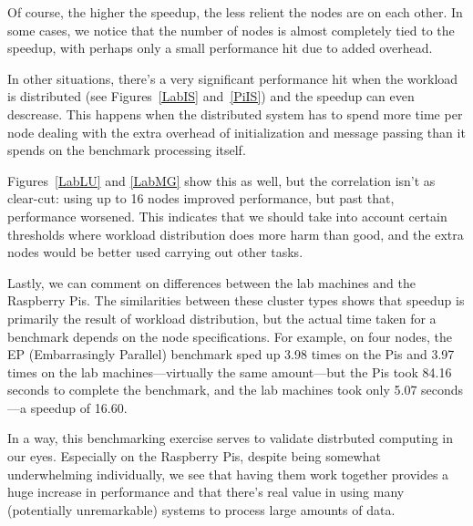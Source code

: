 \documentclass{acm_proc_article-sp}
\begin{document}
Of course, the higher the speedup, the less relient the nodes are on each other. In some cases, we notice that the number of nodes is almost completely tied to the speedup, with perhaps only a small performance hit due to added overhead.

In other situations, there's a very significant performance hit when the workload is distributed (see Figures~\ref{LabIS} and~\ref{PiIS}) and the speedup can even descrease. This happens when the distributed system has to spend more time per node dealing with the extra overhead of initialization and message passing than it spends on the benchmark processing itself.

Figures~\ref{LabLU} and \ref{LabMG} show this as well, but the correlation isn't as clear-cut: using up to 16 nodes improved performance, but past that, performance worsened. This indicates that we should take into account certain thresholds where workload distribution does more harm than good, and the extra nodes would be better used carrying out other tasks.

Lastly, we can comment on differences between the lab machines and the Raspberry Pis. The similarities between these cluster types shows that speedup is primarily the result of workload distribution, but the actual time taken for a benchmark depends on the node specifications. For example, on four nodes, the EP (Embarrasingly Parallel) benchmark sped up 3.98 times on the Pis and 3.97 times on the lab machines---virtually the same amount---but the Pis took 84.16 seconds to complete the benchmark, and the lab machines took only 5.07 seconds---a speedup of 16.60.

In a way, this benchmarking exercise serves to validate distrbuted computing in our eyes. Especially on the Raspberry Pis, despite being somewhat underwhelming individually, we see that having them work together provides a huge increase in performance and that there's real value in using many (potentially unremarkable) systems to process large amounts of data.

\clearpage
\end{document}
